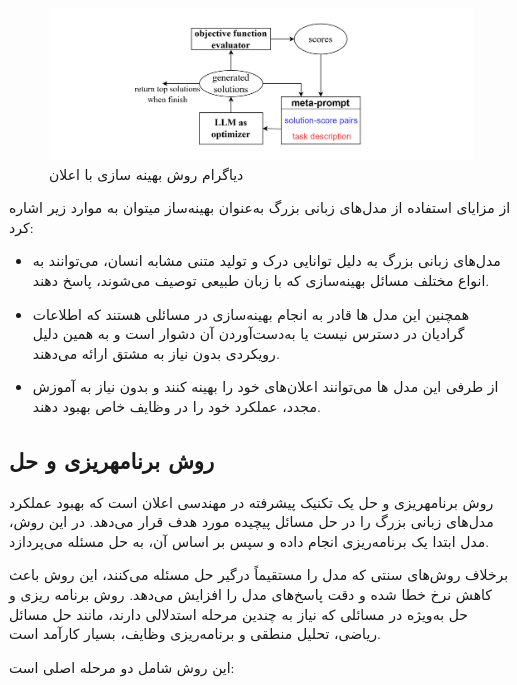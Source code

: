 \begin{figure}[!t]
	\centering
	\includegraphics[width=140mm]{images/opro}
	\caption{دیاگرام روش بهینه سازی با اعلان}
	\label{fig_opro}
\end{figure}


از مزایای استفاده از مدل‌های زبانی بزرگ به‌عنوان بهینه‌ساز می\/توان به موارد زیر اشاره کرد:

\begin{itemize}
	\item 
	مدل‌های زبانی بزرگ به دلیل توانایی درک و تولید متنی مشابه انسان، می‌توانند به انواع مختلف مسائل بهینه‌سازی که با زبان طبیعی توصیف می‌شوند، پاسخ دهند.
	\item 
	همچنین این مدل ها قادر به انجام بهینه‌سازی در مسائلی هستند که اطلاعات گرادیان در دسترس نیست یا به‌دست‌آوردن آن دشوار است و به همین دلیل رویکردی بدون نیاز به مشتق ارائه می‌دهند.
	\item 
	از طرفی این مدل ها می‌توانند اعلان‌های خود را بهینه کنند و بدون نیاز به آموزش مجدد، عملکرد خود را در وظایف خاص بهبود دهند.
\end{itemize}




\subsection{روش برنامه\/ریزی و حل}
روش برنامه\/ریزی و حل
یک تکنیک پیشرفته در مهندسی اعلان است که بهبود عملکرد مدل‌های زبانی بزرگ را در حل مسائل پیچیده مورد هدف قرار می‌دهد. در این روش، مدل ابتدا یک برنامه‌ریزی
 انجام داده و سپس بر اساس آن، به حل مسئله
  می‌پردازد.  

برخلاف روش‌های سنتی که مدل را مستقیماً درگیر حل مسئله می‌کنند، این روش باعث کاهش نرخ خطا شده و دقت پاسخ‌های مدل را افزایش می‌دهد. روش برنامه ریزی و حل به‌ویژه در مسائلی که نیاز به چندین مرحله استدلالی دارند، مانند حل مسائل ریاضی، تحلیل منطقی و برنامه‌ریزی وظایف، بسیار کارآمد است.  


این روش شامل دو مرحله اصلی است:  

